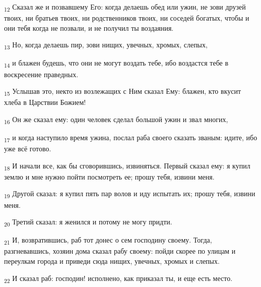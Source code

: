 \begin{tcolorbox}
\textsubscript{12} Сказал же и позвавшему Его: когда делаешь обед или ужин, не зови друзей твоих, ни братьев твоих, ни родственников твоих, ни соседей богатых, чтобы и они тебя когда не позвали, и не получил ты воздаяния.
\end{tcolorbox}
\begin{tcolorbox}
\textsubscript{13} Но, когда делаешь пир, зови нищих, увечных, хромых, слепых,
\end{tcolorbox}
\begin{tcolorbox}
\textsubscript{14} и блажен будешь, что они не могут воздать тебе, ибо воздастся тебе в воскресение праведных.
\end{tcolorbox}
\begin{tcolorbox}
\textsubscript{15} Услышав это, некто из возлежащих с Ним сказал Ему: блажен, кто вкусит хлеба в Царствии Божием!
\end{tcolorbox}
\begin{tcolorbox}
\textsubscript{16} Он же сказал ему: один человек сделал большой ужин и звал многих,
\end{tcolorbox}
\begin{tcolorbox}
\textsubscript{17} и когда наступило время ужина, послал раба своего сказать званым: идите, ибо уже всё готово.
\end{tcolorbox}
\begin{tcolorbox}
\textsubscript{18} И начали все, как бы сговорившись, извиняться. Первый сказал ему: я купил землю и мне нужно пойти посмотреть ее; прошу тебя, извини меня.
\end{tcolorbox}
\begin{tcolorbox}
\textsubscript{19} Другой сказал: я купил пять пар волов и иду испытать их; прошу тебя, извини меня.
\end{tcolorbox}
\begin{tcolorbox}
\textsubscript{20} Третий сказал: я женился и потому не могу придти.
\end{tcolorbox}
\begin{tcolorbox}
\textsubscript{21} И, возвратившись, раб тот донес о сем господину своему. Тогда, разгневавшись, хозяин дома сказал рабу своему: пойди скорее по улицам и переулкам города и приведи сюда нищих, увечных, хромых и слепых.
\end{tcolorbox}
\begin{tcolorbox}
\textsubscript{22} И сказал раб: господин! исполнено, как приказал ты, и еще есть место.
\end{tcolorbox}
